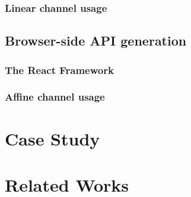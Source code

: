 \documentclass[submission,copyright,creativecommons]{eptcs}
\begin{document}
\subsubsection{Linear channel usage}

\subsection{Browser-side API generation}
\label{section:browser}

\subsubsection{The React Framework}

\subsubsection{Affine channel usage}

\section{Case Study}
\label{section:example}


\section{Related Works}



\end{document}
